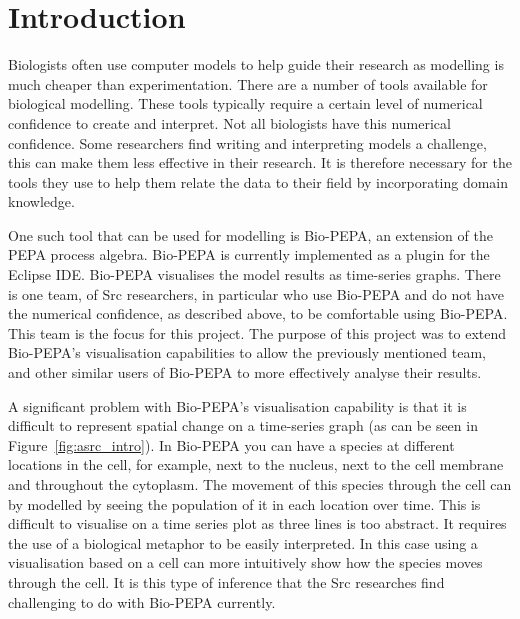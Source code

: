 \section{Introduction}

Biologists often use computer models to help guide their research as modelling is much cheaper than experimentation.  There are a number of tools available for biological modelling.  These tools typically require a certain level of numerical confidence to create and interpret.  Not all biologists have this numerical confidence.  Some researchers find writing and interpreting models a challenge, this can make them less effective in their research.  It is therefore necessary for the tools they use to help them relate the data to their field by incorporating domain knowledge.

One such tool that can be used for modelling is Bio-PEPA, an extension of the PEPA process algebra.  Bio-PEPA is currently implemented as a plugin for the Eclipse IDE.  Bio-PEPA visualises the model results as time-series graphs.  There is one team, of Src researchers, in particular who use Bio-PEPA and do not have the numerical confidence, as described above, to be comfortable using Bio-PEPA.  This team is the focus for this project.  The purpose of this project was to extend Bio-PEPA's visualisation capabilities to allow the previously mentioned team, and other similar users of Bio-PEPA to more effectively analyse their results.

A significant problem with Bio-PEPA's visualisation capability is that it is difficult to represent spatial change on a time-series graph (as can be seen in Figure~\ref{fig:asrc_intro}).  In Bio-PEPA you can have a species at different locations in the cell, for example, next to the nucleus, next to the cell membrane and throughout the cytoplasm.  The movement of this species through the cell can by modelled by seeing the population of it in each location over time.  This is difficult to visualise on a time series plot as three lines is too abstract.  It requires the use of a biological metaphor to be easily interpreted.  In this case using a visualisation based on a cell can more intuitively show how the species moves through the cell.  It is this type of inference that the Src researches find challenging to do with Bio-PEPA currently.

